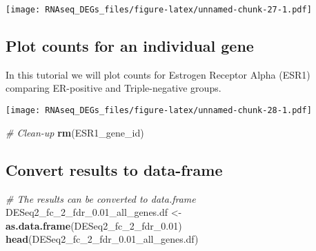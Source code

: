 \documentclass[]{book}
\newenvironment{Shaded}{\begin{snugshade}}{\end{snugshade}}
\newcommand{\KeywordTok}[1]{\textcolor[rgb]{0.13,0.29,0.53}{\textbf{#1}}}
\newcommand{\DataTypeTok}[1]{\textcolor[rgb]{0.13,0.29,0.53}{#1}}
\newcommand{\FloatTok}[1]{\textcolor[rgb]{0.00,0.00,0.81}{#1}}
\newcommand{\StringTok}[1]{\textcolor[rgb]{0.31,0.60,0.02}{#1}}
\newcommand{\CommentTok}[1]{\textcolor[rgb]{0.56,0.35,0.01}{\textit{#1}}}
\newcommand{\OperatorTok}[1]{\textcolor[rgb]{0.81,0.36,0.00}{\textbf{#1}}}
\newcommand{\NormalTok}[1]{#1}
\begin{document}
\texttt{[image: RNAseq\_DEGs\_files/figure-latex/unnamed-chunk-27-1.pdf]}

\subsection{Plot counts for an individual
gene}\label{plot-counts-for-an-individual-gene}

In this tutorial we will plot counts for Estrogen Receptor Alpha (ESR1)
comparing ER-positive and Triple-negative groups.

\begin{Shaded}
\end{Shaded}

\texttt{[image: RNAseq\_DEGs\_files/figure-latex/unnamed-chunk-28-1.pdf]}

\begin{Shaded}
\begin{Highlighting}[]
\CommentTok{# Clean-up}
\KeywordTok{rm}\NormalTok{(ESR1_gene_id)}
\end{Highlighting}
\end{Shaded}

\subsection{Convert results to
data-frame}\label{convert-results-to-data-frame}

\begin{Shaded}
\begin{Highlighting}[]
\CommentTok{# The results can be converted to data.frame}
\NormalTok{DESeq2_fc_2_fdr_}\FloatTok{0.}\NormalTok{01_all_genes.df <-}\StringTok{ }\KeywordTok{as.data.frame}\NormalTok{(DESeq2_fc_2_fdr_}\FloatTok{0.01}\NormalTok{)}
\KeywordTok{head}\NormalTok{(DESeq2_fc_2_fdr_}\FloatTok{0.}\NormalTok{01_all_genes.df)}
\end{Highlighting}
\end{Shaded}
\end{document}
